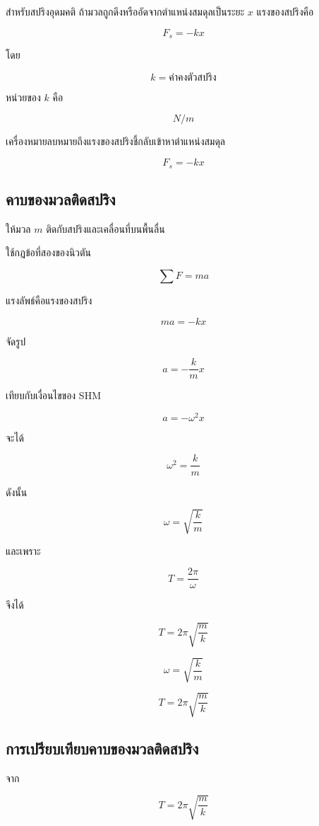 สำหรับสปริงอุดมคติ ถ้ามวลถูกดึงหรืออัดจากตำแหน่งสมดุลเป็นระยะ $x$ แรงของสปริงคือ

\[
F_s=-kx
\]

โดย

\[
k=\text{ค่าคงตัวสปริง}
\]

หน่วยของ $k$ คือ

\[
\si{N/m}
\]

เครื่องหมายลบหมายถึงแรงของสปริงชี้กลับเข้าหาตำแหน่งสมดุล

\begin{tcolorbox}[title=กฎของฮุก]
\[
F_s=-kx
\]
\end{tcolorbox}

\subsection{คาบของมวลติดสปริง}

ให้มวล $m$ ติดกับสปริงและเคลื่อนที่บนพื้นลื่น

ใช้กฎข้อที่สองของนิวตัน

\[
\sum F=ma
\]

แรงลัพธ์คือแรงของสปริง

\[
ma=-kx
\]

จัดรูป

\[
a=-\frac{k}{m}x
\]

เทียบกับเงื่อนไขของ SHM

\[
a=-\omega^2x
\]

จะได้

\[
\omega^2=\frac{k}{m}
\]

ดังนั้น

\[
\omega=\sqrt{\frac{k}{m}}
\]

และเพราะ

\[
T=\frac{2\pi}{\omega}
\]

จึงได้

\[
T=2\pi\sqrt{\frac{m}{k}}
\]

\begin{tcolorbox}[title=มวลติดสปริง]
\[
\omega=\sqrt{\frac{k}{m}}
\]

\[
T=2\pi\sqrt{\frac{m}{k}}
\]
\end{tcolorbox}

\subsection{การเปรียบเทียบคาบของมวลติดสปริง}

จาก

\[
T=2\pi\sqrt{\frac{m}{k}}
\]

